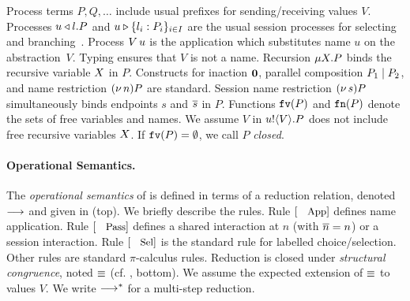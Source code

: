 \documentclass[runningheads]{llncs}
\begin{document}
{%

Process terms $P, Q, \ldots$ 
include usual %
prefixes for sending/receiving values $V$.
Processes $u \triangleleft l . P$ and $u \triangleright \{l_i: P_i\}_{i \in I}$ are the
usual session processes for selecting and branching~\cite{honda.vasconcelos.kubo:language-primitives}.
Process 
$V\, {u}$ 
is the application
which substitutes name $u$ on the abstraction~$V$. 
Typing  ensures that $V$ is not a name.
Recursion   $\mu X. P$ binds the recursive variable $X$ in   $P$.
Constructs for 
inaction $\mathbf{0}$,  parallel composition $P_1 \;|\; P_2$, and 
name restriction $(\nu\, n) P$ are standard.
Session name restriction $(\nu\, s) P$ simultaneously binds endpoints $s$ and $\overline{s}$ in $P$.
Functions $\mathtt{fv}(P)$ and $\mathtt{fn}(P)$ denote the sets of free 
variables and names.
We assume $V$ in $u ! \langle V \rangle .{P}$ does not include free recursive 
variables $X$.
If $\mathtt{fv}(P) = \emptyset$, we call $P$ {\em closed}.






\paragraph{Operational Semantics.}
The \emph{operational semantics} of \HOp is defined in terms of a reduction relation, 
denoted $\longrightarrow$ and 
given in 
  (top).
 We briefly describe the rules. 
Rule $\orule{App}$ defines  name application.
Rule $\orule{Pass}$ defines a shared interaction at $n$ 
(with $\overline{n}=n$) or a session interaction.
Rule $\orule{Sel}$ is the standard rule for labelled choice/selection.%
Other rules are standard $\pi$-calculus rules.
Reduction is closed under \emph{structural congruence}, 
noted $\equiv$ (cf. , bottom). 
We assume the expected extension of $\equiv$ to values $V$.
We write $\longrightarrow^\ast$ for a multi-step reduction.

}
\end{document}
